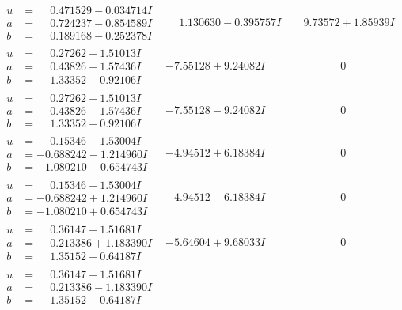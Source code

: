 \documentclass[1p]{elsarticle_modified}
\theoremstyle{definition}
\begin{document}
$$\begin{array}{c|c|c}
\begin{aligned}
u &= \phantom{-}0.471529 - 0.034714 I \\
a &= \phantom{-}0.724237 - 0.854589 I \\
b &= \phantom{-}0.189168 - 0.252378 I\end{aligned}
 & \phantom{-}1.130630 - 0.395757 I & \phantom{-}9.73572 + 1.85939 I \\ \hline\begin{aligned}
u &= \phantom{-}0.27262 + 1.51013 I \\
a &= \phantom{-}0.43826 + 1.57436 I \\
b &= \phantom{-}1.33352 + 0.92106 I\end{aligned}
 & -7.55128 + 9.24082 I & \phantom{-0.000000 } 0 \\ \hline\begin{aligned}
u &= \phantom{-}0.27262 - 1.51013 I \\
a &= \phantom{-}0.43826 - 1.57436 I \\
b &= \phantom{-}1.33352 - 0.92106 I\end{aligned}
 & -7.55128 - 9.24082 I & \phantom{-0.000000 } 0 \\ \hline\begin{aligned}
u &= \phantom{-}0.15346 + 1.53004 I \\
a &= -0.688242 - 1.214960 I \\
b &= -1.080210 - 0.654743 I\end{aligned}
 & -4.94512 + 6.18384 I & \phantom{-0.000000 } 0 \\ \hline\begin{aligned}
u &= \phantom{-}0.15346 - 1.53004 I \\
a &= -0.688242 + 1.214960 I \\
b &= -1.080210 + 0.654743 I\end{aligned}
 & -4.94512 - 6.18384 I & \phantom{-0.000000 } 0 \\ \hline\begin{aligned}
u &= \phantom{-}0.36147 + 1.51681 I \\
a &= \phantom{-}0.213386 + 1.183390 I \\
b &= \phantom{-}1.35152 + 0.64187 I\end{aligned}
 & -5.64604 + 9.68033 I & \phantom{-0.000000 } 0 \\ \hline\begin{aligned}
u &= \phantom{-}0.36147 - 1.51681 I \\
a &= \phantom{-}0.213386 - 1.183390 I \\
b &= \phantom{-}1.35152 - 0.64187 I\end{aligned}

\end{array}$$
\end{document}
